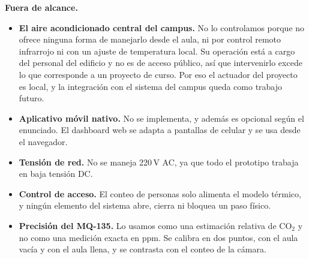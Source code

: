 \documentclass[10pt,a4paper]{article}
\newcommand{\subhead}[1]{\vspace{6pt}\textbf{#1}\par\vspace{0pt}}
\begin{document}
\subhead{Fuera de alcance.}
\begin{itemize}[leftmargin=1.2em,itemsep=1.5pt,topsep=2pt,parsep=0pt]
  \item \textbf{El aire acondicionado central del campus.} No lo controlamos porque no ofrece
  ninguna forma de manejarlo desde el aula, ni por control remoto infrarrojo ni con un ajuste
  de temperatura local. Su operación está a cargo del personal del edificio y no es de acceso
  público, así que intervenirlo excede lo que corresponde a un proyecto de curso. Por eso el
  actuador del proyecto es local, y la integración con el sistema del campus queda como
  trabajo futuro.
  \item \textbf{Aplicativo móvil nativo.} No se implementa, y además es opcional según el
  enunciado. El dashboard web se adapta a pantallas de celular y se usa desde el navegador.
  \item \textbf{Tensión de red.} No se maneja 220\,V AC, ya que todo el prototipo trabaja en
  baja tensión DC.
  \item \textbf{Control de acceso.} El conteo de personas solo alimenta el modelo térmico, y
  ningún elemento del sistema abre, cierra ni bloquea un paso físico.
  \item \textbf{Precisión del MQ-135.} Lo usamos como una estimación relativa de CO$_2$ y no
  como una medición exacta en ppm. Se calibra en dos puntos, con el aula vacía y con el aula
  llena, y se contrasta con el conteo de la cámara.
\end{itemize}
\end{document}
